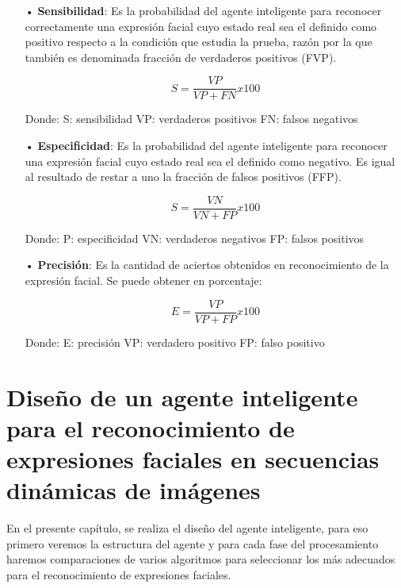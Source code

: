 \begin{itemize}
\item[•] {\bf Sensibilidad}: Es la probabilidad del agente inteligente para reconocer correctamente una expresión facial cuyo estado real sea el definido como positivo respecto a la condición que estudia la prueba, razón por la que también es denominada fracción de verdaderos positivos (FVP).

\begin{equation}
 S = \frac{VP}{VP+FN} x 100
\end{equation}

Donde: \vskip 0.1cm
S: sensibilidad \vskip 0.1cm
VP: verdaderos positivos \vskip 0.1cm
FN: falsos negativos

\item[•] {\bf Especificidad}: Es la probabilidad del agente inteligente para reconocer una expresión facial cuyo estado real sea el definido como negativo. Es igual al resultado de restar a uno la fracción de falsos positivos (FFP).

\begin{equation}
 S = \frac{VN}{VN+FP} x 100
\end{equation}	

Donde: \vskip 0.1cm
P: especificidad \vskip 0.1cm
VN: verdaderos negativos \vskip 0.1cm
FP: falsos positivos

\item[•] {\bf Precisión}: Es la cantidad de aciertos obtenidos en reconocimiento de la expresión facial. Se puede obtener en porcentaje:

\begin{equation}
 E = \frac{VP}{VP+FP} x 100
\end{equation}	

\vskip 1.5cm

Donde: \vskip 0.1cm
E: precisión \vskip 0.1cm
VP: verdadero positivo \vskip 0.1cm
FP: falso positivo	

\end{itemize}


\chapter{Diseño de un agente inteligente para el reconocimiento de expresiones faciales en secuencias dinámicas de imágenes}

En el presente capítulo, se realiza  el diseño del agente inteligente, para eso primero veremos la estructura del agente y para cada fase del procesamiento haremos comparaciones de varios algoritmos para seleccionar los más adecuados para el reconocimiento de expresiones faciales.

